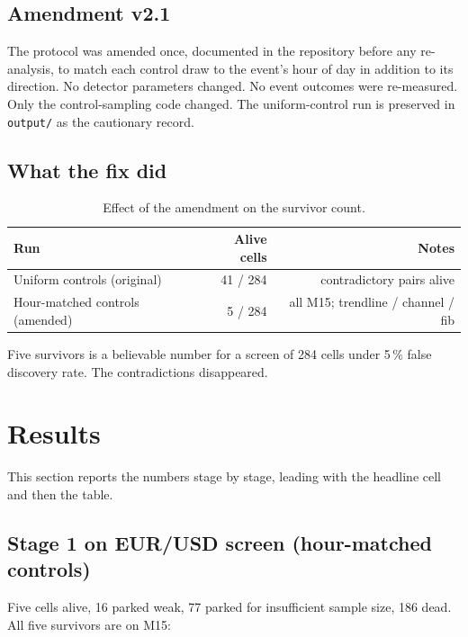 \documentclass[11pt,a4paper]{article}
\begin{document}
\subsection{Amendment v2.1}

The protocol was amended once, documented in the repository before any
re-analysis, to match each control draw to the event's hour of day in
addition to its direction. No detector parameters changed. No event
outcomes were re-measured. Only the control-sampling code changed. The
uniform-control run is preserved in \texttt{output/} as the cautionary
record.

\subsection{What the fix did}

\begin{table}[h]
\centering
\caption{Effect of the amendment on the survivor count.}
\label{tab:amendment}
\begin{tabular}{lrr}
\toprule
Run & Alive cells & Notes \\
\midrule
Uniform controls (original) & 41 / 284 & contradictory pairs alive \\
Hour-matched controls (amended) & 5 / 284 & all M15; trendline / channel / fib \\
\bottomrule
\end{tabular}
\end{table}

Five survivors is a believable number for a screen of 284 cells under
5\,\% false discovery rate. The contradictions disappeared.

\section{Results}\label{sec:results}

This section reports the numbers stage by stage, leading with the
headline cell and then the table.

\subsection{Stage 1 on EUR/USD screen (hour-matched controls)}

Five cells alive, 16 parked weak, 77 parked for insufficient sample
size, 186 dead. All five survivors are on M15:
\end{document}
